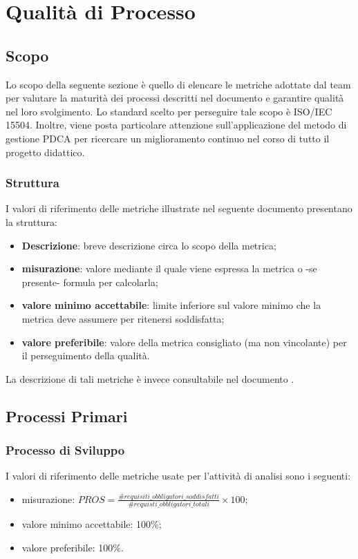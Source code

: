\section{Qualità di Processo}

\subsection{Scopo}
Lo scopo della seguente sezione è quello di elencare le metriche adottate dal team \Gruppo{} per valutare la maturità dei processi descritti nel documento \textit{\NdP} e garantire qualità nel loro svolgimento. Lo standard scelto per perseguire tale scopo è ISO/IEC 15504. Inoltre, viene posta particolare attenzione sull'applicazione del metodo di gestione PDCA per ricercare un miglioramento continuo nel corso di tutto il progetto didattico.

\subsubsection{Struttura}
I valori di riferimento delle metriche illustrate nel seguente documento presentano la struttura:
\begin{itemize}
	\item{\textbf{Descrizione}: breve descrizione circa lo scopo della metrica;}
	\item{\textbf{misurazione}: valore mediante il quale viene espressa la metrica o -se presente- formula per calcolarla;}
	\item{\textbf{valore minimo accettabile}: limite inferiore sul valore minimo che la metrica deve assumere per ritenersi soddisfatta;}
	\item{\textbf{valore preferibile}: valore della metrica consigliato (ma non vincolante) per il perseguimento della qualità.}
\end{itemize}
La descrizione di tali metriche è invece consultabile nel documento \NdP.

\subsection{Processi Primari}

	\subsubsection{Processo di Sviluppo}
	
		I valori di riferimento delle metriche usate per l'attività di analisi sono i seguenti:
				\begin{itemize}
					\item{misurazione: $PROS = \displaystyle\frac{\#requisiti\_obbligatori\_soddisfatti}{\#requisti\_obbligatori\_totali} \times 100$;}
					\item{valore minimo accettabile: 100\%;}
					\item{valore preferibile: 100\%.}
				\end{itemize}

